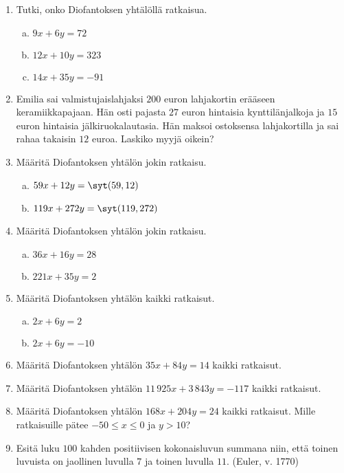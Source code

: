 \begin{enumerate}

\item Tutki, onko Diofantoksen yhtälöllä ratkaisua.
\begin{enumerate}[a)]
\item $9x + 6y = 72$
\item $12x + 10y = 323$
\item $14x + 35y = -91$
\end{enumerate}

\item Emilia sai valmistujaislahjaksi $200$ euron lahjakortin erääseen keramiikkapajaan. Hän osti pajasta $27$ euron hintaisia kynttilänjalkoja ja $15$ euron hintaisia jälkiruokalautasia. Hän maksoi ostoksensa lahjakortilla ja sai rahaa takaisin $12$ euroa. Laskiko myyjä oikein?

\item Määritä Diofantoksen yhtälön jokin ratkaisu.
\begin{enumerate}[a)]
\item $59x + 12y = \syt(59, 12)$
\item $119x + 272y = \syt(119, 272)$
\end{enumerate}

\item Määritä Diofantoksen yhtälön jokin ratkaisu.
\begin{enumerate}[a)]
\item $36x + 16y = 28$
\item $221x + 35y = 2$
\end{enumerate}

\item Määritä Diofantoksen yhtälön kaikki ratkaisut.
\begin{enumerate}[a)]
\item $2x + 6y = 2$
\item $2x + 6y = -10$
\end{enumerate}

\item Määritä Diofantoksen yhtälön $35x + 84y = 14$ kaikki ratkaisut.

\item Määritä Diofantoksen yhtälön $11\, 925x + 3\, 843y = -117$ kaikki ratkaisut.

\item Määritä Diofantoksen yhtälön $168x + 204y = 24$ kaikki ratkaisut. Mille ratkaisuille pätee $-50 \le x \le 0$ ja $y > 10$?

\item  Esitä luku $100$ kahden positiivisen kokonaisluvun summana niin, että toinen luvuista on jaollinen luvulla $7$ ja toinen luvulla $11$. (Euler, v. 1770)


\end{enumerate}
